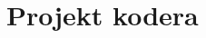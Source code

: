 \documentclass[../../thesis.tex]{subfiles}
\begin{document}
\chapter{Projekt kodera}
\end{document}
